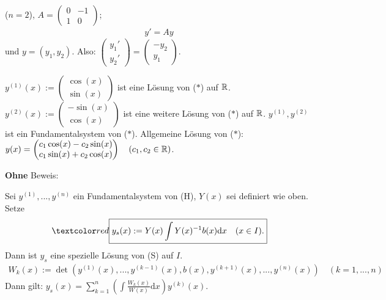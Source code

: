 \documentclass[a4paper,oneside,DIV15,BCOR12mm,chapterprefix=true,headings=onelinechapter]{scrbook}
\begin{document}
\begin{beispiel} ($n=2$), $A = \begin{pmatrix} 0 & -1 \\ 1 & 0 \end{pmatrix}$;
\begin{align*}
\tag{$*$} y' = Ay
\end{align*}
und $y = (y_1, y_2)$. Also: $\begin{pmatrix} y_1' \\ y_2' \end{pmatrix} = \begin{pmatrix} -y_2 \\ y_1 \end{pmatrix}$.

$y^{(1)}(x) := \begin{pmatrix} \cos(x) \\ \sin(x) \end{pmatrix}$ ist eine Lösung von ($*$) auf $\mathbb{R}$.
$y^{(2)}(x) := \begin{pmatrix} -\sin(x) \\ \cos(x) \end{pmatrix}$ ist eine weitere Lösung von ($*$) auf $\mathbb{R}$.
$y^{(1)}, y^{(2)}$ ist ein Fundamentalsystem von ($*$).
Allgemeine Lösung von ($*$): $y(x) = \begin{pmatrix} c_1 \cos(x) - c_2 \sin(x) \\ c_1 \sin(x) + c_2 \cos(x) \end{pmatrix}\quad (c_1, c_2 \in \mathbb{R})$.

\end{beispiel}

\textbf{Ohne} Beweis:

\begin{satz}
Sei $y^{(1)}, ..., y^{(n)}$ ein Fundamentalsystem von (H), $Y(x)$ sei definiert wie oben. Setze
\begin{align*}
\importantbox{y_s(x) := Y(x) \int Y(x)^{-1} b(x) \text{d}x \quad (x \in I).}
\end{align*}
Dann ist $y_s$ eine spezielle Lösung von (S) auf $I$.
\begin{align*}
W_k(x) := \det \left( y^{(1)}(x), ..., y^{(k-1)}(x), b(x), y^{(k+1)}(x), ..., y^{(n)}(x) \right)\quad (k=1,...,n)
\end{align*}
Dann gilt: $y_s(x) = \sum_{k=1}^n \left( \int \frac{W_k(x)}{W(x)} \text{d}x\right) y^{(k)}(x)$.
\end{satz}
\end{document}
